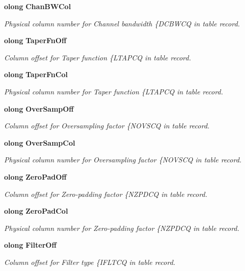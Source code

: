 \begin{CompactItemize}
{\bf olong} {\bf Chan\-BWCol}
\begin{CompactList}\small\item\em Physical column number for Channel bandwidth \{DCBWCQ in table record. \item\end{CompactList}\item 
{\bf olong} {\bf Taper\-Fn\-Off}
\begin{CompactList}\small\item\em Column offset for Taper function \{LTAPCQ in table record. \item\end{CompactList}\item 
{\bf olong} {\bf Taper\-Fn\-Col}
\begin{CompactList}\small\item\em Physical column number for Taper function \{LTAPCQ in table record. \item\end{CompactList}\item 
{\bf olong} {\bf Over\-Samp\-Off}
\begin{CompactList}\small\item\em Column offset for Oversampling factor \{NOVSCQ in table record. \item\end{CompactList}\item 
{\bf olong} {\bf Over\-Samp\-Col}
\begin{CompactList}\small\item\em Physical column number for Oversampling factor \{NOVSCQ in table record. \item\end{CompactList}\item 
{\bf olong} {\bf Zero\-Pad\-Off}
\begin{CompactList}\small\item\em Column offset for Zero-padding factor \{NZPDCQ in table record. \item\end{CompactList}\item 
{\bf olong} {\bf Zero\-Pad\-Col}
\begin{CompactList}\small\item\em Physical column number for Zero-padding factor \{NZPDCQ in table record. \item\end{CompactList}\item 
{\bf olong} {\bf Filter\-Off}
\begin{CompactList}\small\item\em Column offset for Filter type \{IFLTCQ in table record. \item\end{CompactList}\item 

\end{CompactItemize}
